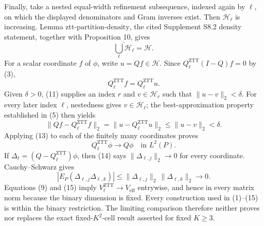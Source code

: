 Finally, take a nested equal-width refinement subsequence, indexed again by \(\ell\), on which the displayed denominators and Gram inverses exist.  Then \(\mathcal H_\ell\) is increasing.  Lemma \(\mathrm{ztt\mbox{-}partition\mbox{-}density}\), the cited Supplement S8.2 density statement, together with Proposition 10, gives
\[
\overline{\bigcup_\ell\mathcal H_\ell}=\mathcal H.                                        \tag{11}
\]
For a scalar coordinate \(f\) of \(\phi\), write \(u=Qf\in\mathcal H\).  Since \(Q_\ell^{\mathrm{ZTT}}(I-Q)f=0\) by (3),
\[
Q_\ell^{\mathrm{ZTT}}f=Q_\ell^{\mathrm{ZTT}}u.                                            \tag{12}
\]
Given \(\delta>0\), (11) supplies an index \(r\) and \(v\in\mathcal H_r\) such that \(\|u-v\|_2<\delta\).  For every later index \(\ell\), nestedness gives \(v\in\mathcal H_\ell\); the best-approximation property established in (5) then yields
\[
\|Qf-Q_\ell^{\mathrm{ZTT}}f\|_2
=\|u-Q_\ell^{\mathrm{ZTT}}u\|_2
\leq\|u-v\|_2<\delta.                                                                     \tag{13}
\]
Applying (13) to each of the finitely many coordinates proves
\[
Q_\ell^{\mathrm{ZTT}}\phi\longrightarrow Q\phi
\quad\text{in }L^2(P).                                                                      \tag{14}
\]
If \(\Delta_\ell=(Q-Q_\ell^{\mathrm{ZTT}})\phi\), then (14) says \(\|\Delta_{\ell,j}\|_2\to0\) for every coordinate.  Cauchy--Schwarz gives
\[
\left|E_P(\Delta_{\ell,j}\Delta_{\ell,k})\right|
\leq\|\Delta_{\ell,j}\|_2\,\|\Delta_{\ell,k}\|_2\longrightarrow0.                    \tag{15}
\]
Equations (9) and (15) imply \(V_\ell^{\mathrm{ZTT}}\to V_{\mathrm{eff}}\) entrywise, and hence in every matrix norm because the binary dimension is fixed.  Every construction used in (1)--(15) is within the binary restriction.  The limiting comparison therefore neither proves nor replaces the exact fixed-\(K^2\)-cell result asserted for fixed \(K\geq3\).
